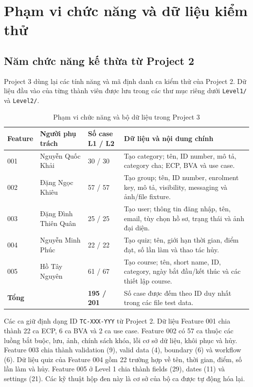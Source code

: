 \section{Phạm vi chức năng và dữ liệu kiểm thử}
\label{sec:scope}

\subsection{Năm chức năng kế thừa từ Project 2}
Project 3 dùng lại các tính năng và mã định danh ca kiểm thử của Project 2. Dữ liệu đầu vào của từng thành viên được lưu trong các thư mục riêng dưới \texttt{Level1/} và \texttt{Level2/}.\cite{prj2report,prj3source}

\begin{table}[H]
\centering
\caption{Phạm vi chức năng và bộ dữ liệu trong Project 3}
\label{tab:functional-scope}
\small
\begin{tabular}{|p{1.4cm}|p{3.2cm}|p{3.0cm}|p{6.2cm}|}
\hline
\textbf{Feature} & \textbf{Người phụ trách} & \textbf{Số case L1 / L2} & \textbf{Dữ liệu và nội dung chính} \\
\hline
001 & Nguyễn Quốc Khải & 30 / 30 & Tạo category; tên, ID number, mô tả, category cha; ECP, BVA và use case. \\
\hline
002 & Đặng Ngọc Khiêu & 57 / 57 & Tạo group; tên, ID number, enrolment key, mô tả, visibility, messaging và ảnh/file fixture. \\
\hline
003 & Đặng Đình Thiên Quân & 25 / 25 & Tạo user; thông tin đăng nhập, tên, email, tùy chọn hồ sơ, trạng thái và ảnh đại diện. \\
\hline
004 & Nguyễn Minh Phúc & 22 / 22 & Tạo quiz; tên, giới hạn thời gian, điểm đạt, số lần làm và thao tác hủy. \\
\hline
005 & Hồ Tây Nguyên & 61 / 67 & Tạo course; tên, short name, ID, category, ngày bắt đầu/kết thúc và các thiết lập course. \\
\hline
\textbf{Tổng} &  & \textbf{195 / 201} & Số case được đếm theo ID duy nhất trong các file test data. \\
\hline
\end{tabular}
\end{table}

Các ca giữ định dạng ID \texttt{TC-XXX-YYY} từ Project 2. Dữ liệu Feature 001 chia thành 22 ca ECP, 6 ca BVA và 2 ca use case. Feature 002 có 57 ca thuộc các luồng bắt buộc, lưu, ảnh, chính sách khóa, lỗi cơ sở dữ liệu, khôi phục và hủy. Feature 003 chia thành validation (9), valid data (4), boundary (6) và workflow (6). Dữ liệu quiz của Feature 004 gồm 22 trường hợp về tên, thời gian, điểm, số lần làm và hủy. Feature 005 ở Level 1 chia thành fields (29), dates (11) và settings (21). Các kỹ thuật hộp đen này là cơ sở của bộ ca được tự động hóa lại.\cite{blackboxslides,prj2report}

